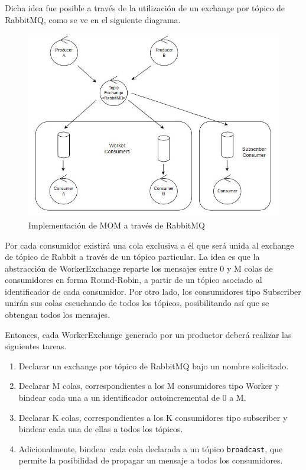 \documentclass[titlepage,a4paper,oneside]{article}
\begin{document}
Dicha idea fue posible a través de la utilización de un exchange por tópico de RabbitMQ, como se ve en el siguiente diagrama.

\begin{figure}[H]
	\centering
	\includegraphics[width=13cm]{img/mom_diagram.JPG}
	\caption{Implementación de MOM a través de RabbitMQ}
\end{figure}

Por cada consumidor existirá una cola exclusiva a él que será unida al exchange de tópico de Rabbit a través de un tópico particular. La idea es que la abstracción de WorkerExchange reparte los mensajes entre 0 y M colas de consumidores en forma Round-Robin, a partir de un tópico asociado al identificador de cada consumidor. Por otro lado, los consumidores tipo Subscriber unirán sus colas escuchando de todos los tópicos, posibilitando así que se obtengan todos los mensajes.

Entonces, cada WorkerExchange generado por un productor deberá realizar las siguientes tareas.
\begin{enumerate}
    \item Declarar un exchange por tópico de RabbitMQ bajo un nombre solicitado.
    \item Declarar M colas, correspondientes a los M consumidores tipo Worker y bindear cada una a un identificador autoincremental de 0 a M.
    \item Declarar K colas, correspondientes a los K consumidores tipo subscriber y bindear cada una de ellas a todos los tópicos.
    \item Adicionalmente, bindear cada cola declarada a un tópico \texttt{broadcast}, que permite la posibilidad de propagar un mensaje a todos los consumidores.
\end{enumerate}
\end{document}
